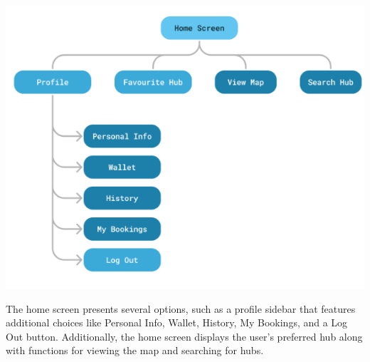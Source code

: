 \documentclass{scrreprt}
\begin{document}
\begin{center}
    \includegraphics*[scale=0.75]{home-screen-interface.png}
\end{center}
The home screen presents several options, such as a profile sidebar that features additional choices like Personal Info, Wallet, History, My Bookings, and a Log Out button. Additionally, the home screen displays the user's preferred hub along with functions for viewing the map and searching for hubs.
\end{document}

